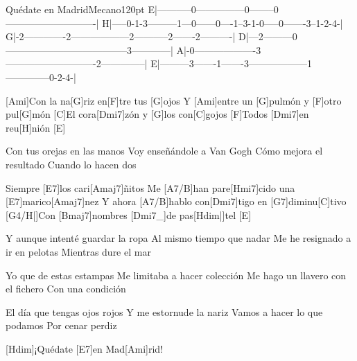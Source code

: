 \begin{song}{Quédate en Madrid}{Mecano}{120pt}
\tabs{20pt}
E|-----------0---------------0--------0----------------------------|
H|-----0-1-3---------1---0------0----1--3-1-0-----0-------3--1-2-4-|
G|-2-------------2------------------2-----------2-------2----------|
D|---2---------0--------------------------------------3------------|
A|-0-------------------3----------------------------2--------------|
E|---------3-------1-------3------------------1--------------0-2-4-|
\endtabs

%
[Ami]Con la na[G]riz en[F]tre tus [G]ojos
Y [Ami]entre un [G]pulmón y [F]otro pul[G]món
[C]El cora[Dmi7]zón y [G]los con[C]gojos
[F]Todos [Dmi7]en reu[H]nión [E]{}

%
Con tus orejas en las manos
Voy enseñándole a Van Gogh
Cómo mejora el resultado
Cuando lo hacen dos

\chorus%
[Hmi7]Siempre [E7]los cari[Amaj7]{}ñitos
Me [A7/B]han pare[Hmi7]cido una [E7]marico[Amaj7]nez
Y ahora [A7/B]hablo con[Dmi7]tigo en [G7]diminu[C]tivo
[G4/H|]{}Con [Bmaj7]nombres [Dmi7_]{de pas}[Hdim|]{tel} [E]{}

%
Y aunque intenté guardar la ropa
Al mismo tiempo que nadar
Me he resignado a ir en pelotas
Mientras dure el mar

\pagebreak
\chorus%
Yo que de estas estampas
Me limitaba a hacer colección
Me hago un llavero con el fichero
Con una condición

%
El día que tengas ojos rojos
Y me estornude la nariz
Vamos a hacer lo que podamos
Por cenar perdiz

[Hdim]{}¡Quédate [E7]en Mad[Ami]rid!
\end{song}
